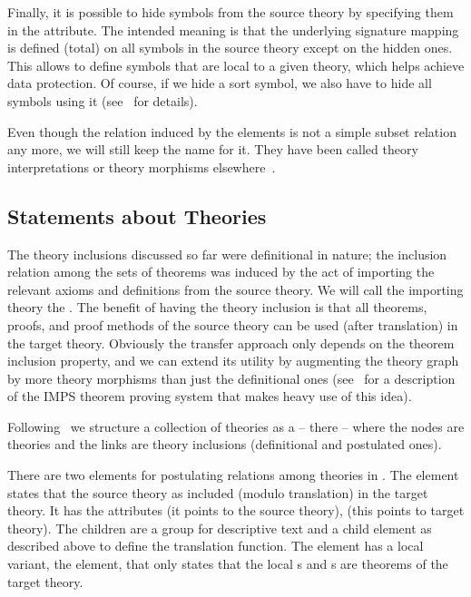 Finally, it is possible to hide symbols from the source theory by specifying them
in the {} attribute. The intended meaning is that the
underlying signature mapping is defined (total) on all symbols in the source
theory except on the hidden ones. This allows to define symbols that are local to
a given theory, which helps achieve data protection. Of course, if we hide a sort
symbol, we also have to hide all symbols using it
(see~\cite{CoFI98,MosAutHut:edgwh01} for details).

Even though the relation induced by the {} elements is not a
simple subset relation any more, we will still keep the name
{} for it. They have been called theory
interpretations or
theory morphisms
elsewhere~\cite{Farmer93}.


\subsection{Statements about Theories}\label{sec:redundant-links}

The theory inclusions discussed so far were definitional in nature; the inclusion
relation among the sets of theorems was induced by the act of importing the
relevant axioms and definitions from the source theory. We will call the importing
theory the {}. The benefit of having the
theory inclusion is that all theorems, proofs, and proof methods of the source
theory can be used (after translation) in the target theory. Obviously the
transfer approach only depends on the theorem inclusion property, and we can
extend its utility by augmenting the theory graph by more theory morphisms than
just the definitional ones (see~\cite{FaGu93} for a description of the IMPS
theorem proving system that makes heavy use of this idea).

Following~\cite{Hutter:mocsv00} we structure a collection of theories as a
{} -- {} there -- where the nodes are
theories and the links are theory inclusions (definitional and postulated ones). 

There are two {} elements for postulating relations among
theories in {\omdoc}.  The {} element states that the
source theory as included (modulo translation) in the target theory. It has the
attributes {} (it points to the source theory),
{} (this points to target theory). The children
are a {} group for descriptive text and a {} child
element as described above to define the translation function. The
{} element has a local variant, the
{} element, that only states that the local
{s} and {s} are theorems of the target theory.

